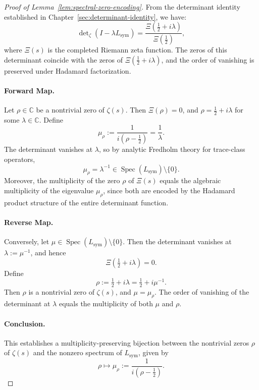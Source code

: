 \begin{proof}[Proof of Lemma~\ref{lem:spectral-zero-encoding}]
From the determinant identity established in Chapter~\ref{sec:determinant-identity}, we have:
\[
\det\nolimits_{\zeta}(I - \lambda L_{\mathrm{sym}}) = \frac{\Xi\left( \tfrac{1}{2} + i\lambda \right)}{\Xi\left( \tfrac{1}{2} \right)},
\]
where \( \Xi(s) \) is the completed Riemann zeta function. The zeros of this determinant coincide with the zeros of \( \Xi(\tfrac{1}{2} + i\lambda) \), and the order of vanishing is preserved under Hadamard factorization.

\paragraph{Forward Map.}
Let \( \rho \in \mathbb{C} \) be a nontrivial zero of \( \zeta(s) \). Then \( \Xi(\rho) = 0 \), and \( \rho = \tfrac{1}{2} + i\lambda \) for some \( \lambda \in \mathbb{C} \). Define
\[
\mu_\rho := \frac{1}{i(\rho - \tfrac{1}{2})} = \frac{1}{\lambda}.
\]
The determinant vanishes at \( \lambda \), so by analytic Fredholm theory for trace-class operators,
\[
\mu_\rho = \lambda^{-1} \in \operatorname{Spec}(L_{\mathrm{sym}}) \setminus \{0\}.
\]
Moreover, the multiplicity of the zero \( \rho \) of \( \Xi(s) \) equals the algebraic multiplicity of the eigenvalue \( \mu_\rho \), since both are encoded by the Hadamard product structure of the entire determinant function.

\paragraph{Reverse Map.}
Conversely, let \( \mu \in \operatorname{Spec}(L_{\mathrm{sym}}) \setminus \{0\} \). Then the determinant vanishes at \( \lambda := \mu^{-1} \), and hence
\[
\Xi\left(\tfrac{1}{2} + i\lambda\right) = 0.
\]
Define
\[
\rho := \tfrac{1}{2} + i\lambda = \tfrac{1}{2} + i\mu^{-1}.
\]
Then \( \rho \) is a nontrivial zero of \( \zeta(s) \), and \( \mu = \mu_\rho \). The order of vanishing of the determinant at \( \lambda \) equals the multiplicity of both \( \mu \) and \( \rho \).

\paragraph{Conclusion.}
This establishes a multiplicity-preserving bijection between the nontrivial zeros \( \rho \) of \( \zeta(s) \) and the nonzero spectrum of \( L_{\mathrm{sym}} \), given by
\[
\rho \mapsto \mu_\rho := \frac{1}{i(\rho - \tfrac{1}{2})}.
\]
\end{proof}
